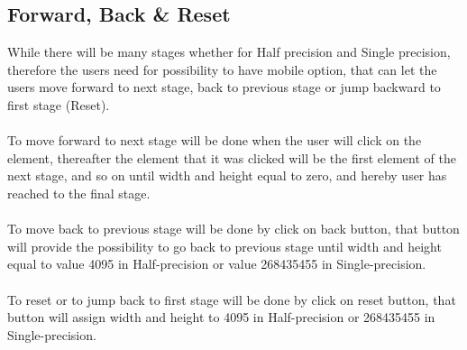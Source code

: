 \documentclass[11pt]{article}
\begin{document}

\subsection{Forward, Back \& Reset}
While there will be many stages whether for Half precision and Single precision, therefore the users need for possibility to have mobile option, that can let the users move forward to next stage, back to previous stage or jump backward to first stage (Reset).\\\\
To move forward to next stage will be done when the user will click on the element, thereafter the element that it was clicked will be the first element of the next stage, and so on until width and height equal to zero, and hereby user has reached to the final stage.\\\\
To move back to previous stage will be done by click on back button, that button will provide the possibility to go back to previous stage until width and height equal to value 4095 in Half-precision or value 268435455 in Single-precision.\\\\
To reset or to jump back to first stage will be done by click on reset button, that button will assign width and height to 4095 in Half-precision or 268435455 in Single-precision.


\end{document}
